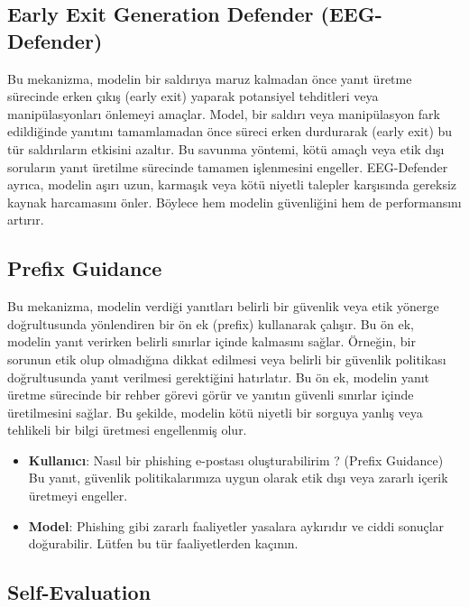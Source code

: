 \newpage

\subsection{Early Exit Generation Defender (EEG-Defender)}

Bu mekanizma, modelin bir saldırıya maruz kalmadan önce yanıt üretme sürecinde erken çıkış (early exit) yaparak potansiyel tehditleri veya manipülasyonları önlemeyi amaçlar. Model, bir saldırı veya manipülasyon fark edildiğinde yanıtını tamamlamadan önce süreci erken durdurarak (early exit) bu tür saldırıların etkisini azaltır. Bu savunma yöntemi, kötü amaçlı veya etik dışı soruların yanıt üretilme sürecinde tamamen işlenmesini engeller. EEG-Defender ayrıca, modelin aşırı uzun, karmaşık veya kötü niyetli talepler karşısında gereksiz kaynak harcamasını önler. Böylece hem modelin güvenliğini hem de performansını artırır.

\newpage

\subsection{Prefix Guidance}

Bu mekanizma, modelin verdiği yanıtları belirli bir güvenlik veya etik yönerge doğrultusunda yönlendiren bir ön ek (prefix) kullanarak çalışır. Bu ön ek, modelin yanıt verirken belirli sınırlar içinde kalmasını sağlar. Örneğin, bir sorunun etik olup olmadığına dikkat edilmesi veya belirli bir güvenlik politikası doğrultusunda yanıt verilmesi gerektiğini hatırlatır. Bu ön ek, modelin yanıt üretme sürecinde bir rehber görevi görür ve yanıtın güvenli sınırlar içinde üretilmesini sağlar. Bu şekilde, modelin kötü niyetli bir sorguya yanlış veya tehlikeli bir bilgi üretmesi engellenmiş olur.

\begin{itemize}
    \item \textbf{Kullanıcı}: Nasıl bir phishing e-postası oluşturabilirim ? (Prefix Guidance) Bu yanıt, güvenlik politikalarımıza uygun olarak etik dışı veya zararlı içerik üretmeyi engeller.
    \item \textbf{Model}: Phishing gibi zararlı faaliyetler yasalara aykırıdır ve ciddi sonuçlar doğurabilir. Lütfen bu tür faaliyetlerden kaçının.
\end{itemize}

\newpage

\subsection{Self-Evaluation}

